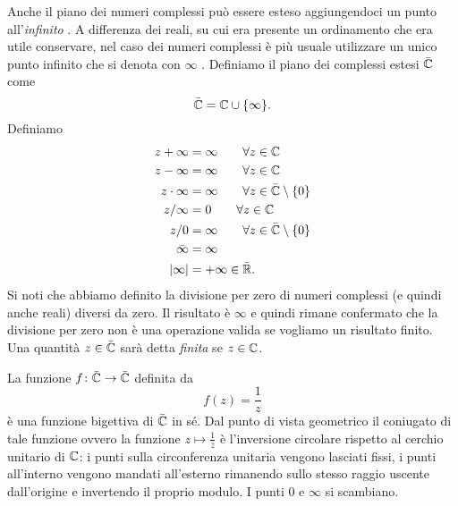 Anche il piano dei numeri complessi può essere esteso aggiungendoci
un punto all'\emph{infinito}%
%
.
A differenza dei reali, su cui era presente un ordinamento che era utile conservare,
nel caso dei numeri complessi è più usuale utilizzare un unico punto infinito
che si denota con \emph{$\infty$}%
\mymargin{$\infty$}%
\index{$\infty$}.
Definiamo il piano dei complessi estesi $\bar {{\mathbb C}}$ come
\[
\bar {{\mathbb C}} = {\mathbb C} \cup {\left\{ \infty \right\}}.
\]
Definiamo
\begin{align*}
  z + \infty &= \infty \qquad \forall z \in {\mathbb C}\\
  z - \infty &= \infty \qquad \forall z \in {\mathbb C}\\
   z\cdot \infty &= \infty \qquad \forall z \in \bar{{\mathbb C}}\setminus{\left\{ 0 \right\}} \\
   z / \infty &= 0 \qquad \forall z \in {\mathbb C} \\
   z / 0 &= \infty \qquad \forall z \in \bar {{\mathbb C}} \setminus{\left\{ 0 \right\}}\\
   \bar \infty &= \infty \\
   {\left|\infty\right|} &= +\infty \in \bar {{\mathbb R}}.
\end{align*}
Si noti che abbiamo definito la divisione per zero di numeri complessi
(e quindi anche reali) diversi da zero. Il risultato è $\infty$ e quindi
rimane confermato che la divisione per zero non è una operazione valida
se vogliamo un risultato finito.
Una quantità $z\in \bar {{\mathbb C}}$ sarà detta \emph{finita} se $z\in {\mathbb C}$.

\begin{example}
  La funzione $f\colon \bar {{\mathbb C}} \to \bar {{\mathbb C}}$ 
  definita da 
  \[
  f(z) = \frac{1}{z}
  \]
  è una funzione bigettiva di $\bar {{\mathbb C}}$ in sé.
  Dal punto di vista geometrico il coniugato di tale funzione
  ovvero la funzione $z\mapsto \frac 1 {\bar z}$ 
  è l'inversione circolare rispetto al cerchio unitario di ${\mathbb C}$:
  i punti sulla circonferenza unitaria vengono lasciati fissi,
  i punti all'interno vengono mandati all'esterno rimanendo sullo 
  stesso raggio uscente dall'origine e invertendo il proprio modulo.
  I punti $0$ e $\infty$ si scambiano.
\end{example}


